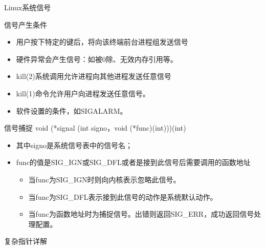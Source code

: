 \begin{frame}{Linux系统信号}
\begin{center}\end{center}
\end{frame}

\begin{frame}{信号产生条件}
\begin{itemize}
\item 用户按下特定的键后，将向该终端前台进程组发送信号 
\item 硬件异常会产生信号：如被0除、无效内存引用等。
\item kill(2)系统调用允许进程向其他进程发送任意信号
\item kill(1)命令允许用户向进程发送任意信号。
\item 软件设置的条件，如SIGALARM。
\end{itemize}
\end{frame}

\begin{frame}{信号捕捉}
void (*signal (int signo，void (*func)(int)))(int)
\begin{itemize}
\item 其中signo是系统信号表中的信号名；
\item func的值是SIG\_IGN或SIG\_DFL或者是接到此信号后需要调用的函数地址
\begin{itemize}
\item 当func为SIG\_IGN时则向内核表示忽略此信号。
\item 当func为SIG\_DFL表示接到此信号的动作是系统默认动作。 
\item 当func为函数地址时为捕捉信号。出错则返回SIG\_ERR，成功返回信号处理配置。
\end{itemize}
\end{itemize}
\end{frame}

\begin{frame}{复杂指针详解}
\begin{center}\end{center}
\end{frame}

